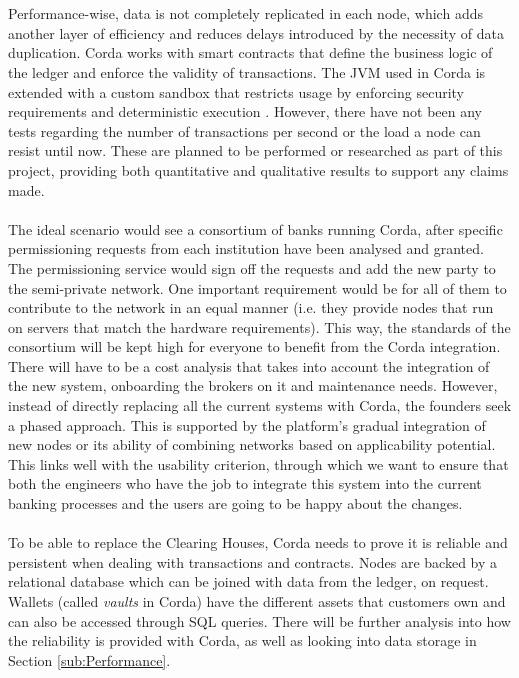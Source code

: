 \documentclass[12pt,twoside]{article}
\begin{document}
\\ \\
Performance-wise, data is not completely replicated in each node, which adds another layer of efficiency and reduces delays introduced by the necessity of data duplication. Corda works with smart contracts that define the business logic of the ledger and enforce the validity of transactions. The JVM used in Corda is extended with a custom sandbox that restricts usage by enforcing security requirements and deterministic execution \cite{Corda:IP}. However, there have not been any tests regarding the number of transactions per second or the load a node can resist until now. These are planned to be performed or researched as part of this project, providing both quantitative and qualitative results to support any claims made.
\\ \\
The ideal scenario would see a consortium of banks running Corda, after specific permissioning requests from each institution have been analysed and granted. The permissioning service would sign off the requests and add the new party to the semi-private network. One important requirement would be for all of them to contribute to the network in an equal manner (i.e. they provide nodes that run on servers that match the hardware requirements). This way, the standards of the consortium will be kept high for everyone to benefit from the Corda integration. There will have to be a cost analysis that takes into account the integration of the new system, onboarding the brokers on it and maintenance needs. However, instead of directly replacing all the current systems with Corda, the founders seek a phased approach. This is supported by the platform's gradual integration of new nodes or its ability of combining networks based on applicability potential. This links well with the usability criterion, through which we want to ensure that both the engineers who have the job to integrate this system into the current banking processes and the users are going to be happy about the changes.
\\ \\
To be able to replace the Clearing Houses, Corda needs to prove it is reliable and persistent when dealing with transactions and contracts. Nodes are backed by a relational database which can be joined with data from the ledger, on request. Wallets (called \textit{vaults} in Corda) have the different assets that customers own and can also be accessed through SQL queries.  There will be further analysis into how the reliability is provided with Corda, as well as looking into data storage in Section \ref{sub:Performance}.
\end{document}
